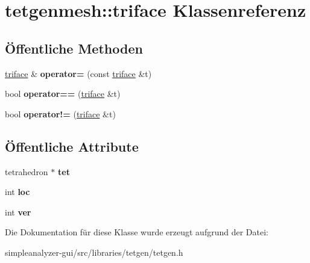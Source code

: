 \hypertarget{classtetgenmesh_1_1triface}{\section{tetgenmesh\-:\-:triface Klassenreferenz}
\label{classtetgenmesh_1_1triface}
}
\subsection*{Öffentliche Methoden}
\begin{DoxyCompactItemize}
\item 
\hypertarget{classtetgenmesh_1_1triface_aeb0b1b77a12ca18599472e01ae8fe119}{\hyperlink{classtetgenmesh_1_1triface}{triface} \& {\bfseries operator=} (const \hyperlink{classtetgenmesh_1_1triface}{triface} \&t)}\label{classtetgenmesh_1_1triface_aeb0b1b77a12ca18599472e01ae8fe119}

\item 
\hypertarget{classtetgenmesh_1_1triface_acab46ae19de31c494a95439b26bcde4e}{bool {\bfseries operator==} (\hyperlink{classtetgenmesh_1_1triface}{triface} \&t)}\label{classtetgenmesh_1_1triface_acab46ae19de31c494a95439b26bcde4e}

\item 
\hypertarget{classtetgenmesh_1_1triface_a03411cf02f8e89d6130035e96d1370d5}{bool {\bfseries operator!=} (\hyperlink{classtetgenmesh_1_1triface}{triface} \&t)}\label{classtetgenmesh_1_1triface_a03411cf02f8e89d6130035e96d1370d5}

\end{DoxyCompactItemize}
\subsection*{Öffentliche Attribute}
\begin{DoxyCompactItemize}
\item 
\hypertarget{classtetgenmesh_1_1triface_ad3b174c4040b18a5286ddfeb8db02529}{tetrahedron $\ast$ {\bfseries tet}}\label{classtetgenmesh_1_1triface_ad3b174c4040b18a5286ddfeb8db02529}

\item 
\hypertarget{classtetgenmesh_1_1triface_a3588d2cb087d2d8448c3482ddc3a2a5b}{int {\bfseries loc}}\label{classtetgenmesh_1_1triface_a3588d2cb087d2d8448c3482ddc3a2a5b}

\item 
\hypertarget{classtetgenmesh_1_1triface_a2b2b1dc34da73125359d6db535d75f7c}{int {\bfseries ver}}\label{classtetgenmesh_1_1triface_a2b2b1dc34da73125359d6db535d75f7c}

\end{DoxyCompactItemize}


Die Dokumentation für diese Klasse wurde erzeugt aufgrund der Datei\-:\begin{DoxyCompactItemize}
\item 
simpleanalyzer-\/gui/src/libraries/tetgen/tetgen.\-h\end{DoxyCompactItemize}
